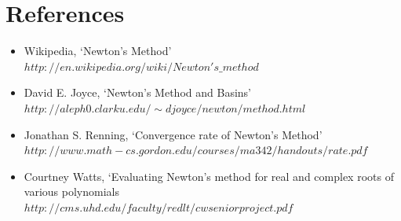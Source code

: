 \documentclass[15pt]{report}
\begin{document}
\section*{References}
\begin{itemize}
\item Wikipedia, `Newton's Method' \\$http://en.wikipedia.org/wiki/Newton's\_method$
\item David E. Joyce, `Newton's Method and Basins'\\$http://aleph0.clarku.edu/\sim djoyce/newton/method.html$
\item Jonathan S. Renning, `Convergence rate of Newton's Method'\\$http://www.math-cs.gordon.edu/courses/ma342/handouts/rate.pdf$
\item Courtney Watts, `Evaluating Newton's method for real and complex roots of various polynomials\\
$http://cms.uhd.edu/faculty/redlt/cwseniorproject.pdf$
\end{itemize}

   
\end{document}
